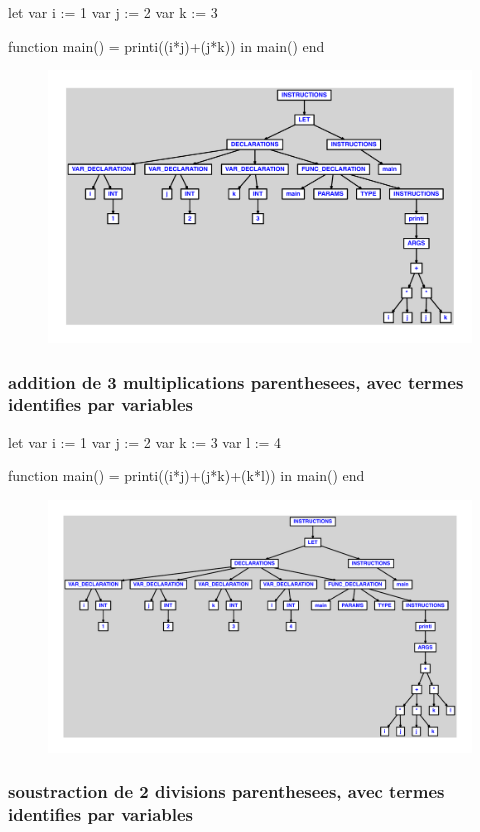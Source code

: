 \documentclass{article}
\begin{document}
\begin{verbatimtab}
let
	var i := 1
	var j := 2
	var k := 3

	function main() = printi((i*j)+(j*k))
in main() end
\end{verbatimtab}
\begin{figure}[H]\centering\includegraphics[max width=\textwidth]{ast/ast_131.pdf}\end{figure}\subsubsection{addition de 3 multiplications parenthesees, avec termes identifies par variables}
\begin{verbatimtab}
let
	var i := 1
	var j := 2
	var k := 3
	var l := 4

	function main() = printi((i*j)+(j*k)+(k*l))
in main() end
\end{verbatimtab}
\begin{figure}[H]\centering\includegraphics[max width=\textwidth]{ast/ast_132.pdf}\end{figure}\subsubsection{soustraction de 2 divisions parenthesees, avec termes identifies par variables}
\end{document}
